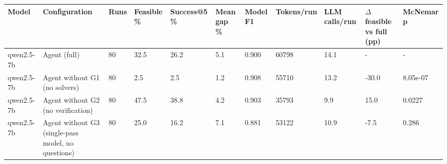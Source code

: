 \begin{tabular}{lllllllllll}
\toprule
Model & Configuration & Runs & Feasible \% & Success@5 \% & Mean gap \% & Model F1 & Tokens/run & LLM calls/run & $\Delta$ feasible vs full (pp) & McNemar p \\
\midrule
qwen2.5-7b & Agent (full) & 80 & 32.5 & 26.2 & 5.1 & 0.900 & 60798 & 14.1 & - & - \\
qwen2.5-7b & Agent without G1 (no solvers) & 80 & 2.5 & 2.5 & 1.2 & 0.908 & 55710 & 13.2 & -30.0 & 8.05e-07 \\
qwen2.5-7b & Agent without G2 (no verification) & 80 & 47.5 & 38.8 & 4.2 & 0.903 & 35793 & 9.9 & 15.0 & 0.0227 \\
qwen2.5-7b & Agent without G3 (single-pass model, no questions) & 80 & 25.0 & 16.2 & 7.1 & 0.881 & 53122 & 10.9 & -7.5 & 0.286 \\
\bottomrule
\end{tabular}
